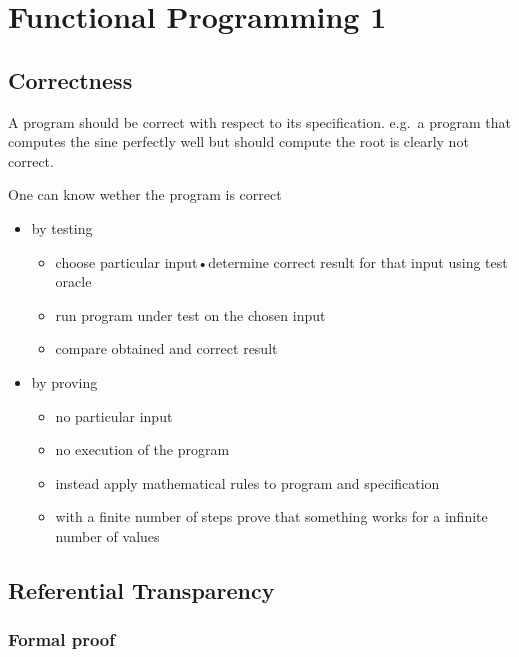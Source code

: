 \hypertarget{functional-programming-1}{%
\section{Functional Programming 1}\label{functional-programming-1}}

\hypertarget{correctness}{%
\subsection{Correctness}\label{correctness}}

A program should be correct with respect to its specification. e.g.~a
program that computes the sine perfectly well but should compute the
root is clearly not correct.

One can know wether the program is correct

\begin{itemize}
\tightlist
\item
  by testing

  \begin{itemize}
  \tightlist
  \item
    choose particular input•determine correct result for that input
    using test oracle
  \item
    run program under test on the chosen input
  \item
    compare obtained and correct result
  \end{itemize}
\item
  by proving

  \begin{itemize}
  \tightlist
  \item
    no particular input
  \item
    no execution of the program
  \item
    instead apply mathematical rules to program and specification
  \item
    with a finite number of steps prove that something works for a
    infinite number of values
  \end{itemize}
\end{itemize}

\hypertarget{referential-transparency}{%
\subsection{Referential Transparency}\label{referential-transparency}}

\hypertarget{formal-proof}{%
\subsubsection{Formal proof}\label{formal-proof}}

